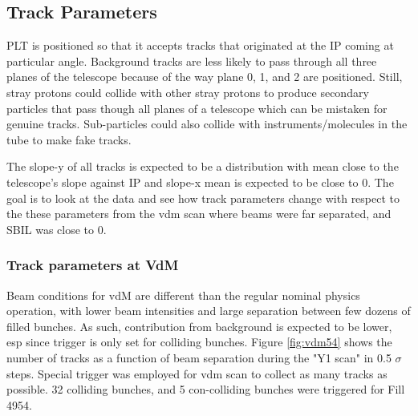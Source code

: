 \subsection{Track Parameters} \label{sec:trackparams}

PLT is positioned so that it accepts tracks that originated at the IP coming at particular angle. Background tracks are less likely to pass through all three planes of the telescope because of the way plane 0, 1, and 2 are positioned. Still, stray protons could collide with other stray protons to produce secondary particles that pass though all planes of a telescope which can be mistaken for genuine tracks. Sub-particles could also collide with instruments/molecules in the tube to make fake tracks. 

The slope-y of all tracks is expected to be a distribution with mean close to the telescope's slope against IP and slope-x mean is expected to be close to 0. The goal is to look at the data and see how track parameters change with respect to the these parameters from the vdm scan where beams were far separated, and SBIL was close to 0.


\subsubsection{Track parameters at VdM}
Beam conditions for vdM are different than the regular nominal physics operation, with lower beam intensities and large separation between few dozens of filled bunches. As such, contribution from background is expected to be lower, esp since trigger is only set for colliding bunches. Figure \ref{fig:vdm54} shows the number of tracks as a function of beam separation during the "Y1 scan" in 0.5 $\sigma$ steps. Special trigger was employed for vdm scan to collect as many tracks as possible. 32 colliding bunches, and 5 con-colliding bunches were triggered for Fill 4954. 





